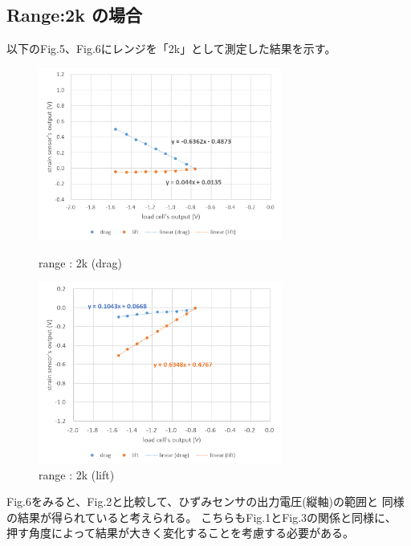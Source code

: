 \documentclass[twocolumn,a4j]{jsarticle}
\begin{document}
\subsection{Range:2k の場合}
以下のFig.5、Fig.6にレンジを「2k」として測定した結果を示す。
\begin{figure}[htbp]
    \footnotesize
    \begin{center}
        \includegraphics[width=80mm]{../images/2k_drag.png}
        \caption{range : 2k (drag)}
        \includegraphics[width=80mm]{../images/2k_lift.png}
        \caption{range : 2k (lift)}
    \end{center}
\end{figure}\par
Fig.6をみると、Fig.2と比較して、ひずみセンサの出力電圧(縦軸)の範囲と
同様の結果が得られていると考えられる。
こちらもFig.1とFig.3の関係と同様に、
押す角度によって結果が大きく変化することを考慮する必要がある。
\newpage
\end{document}

